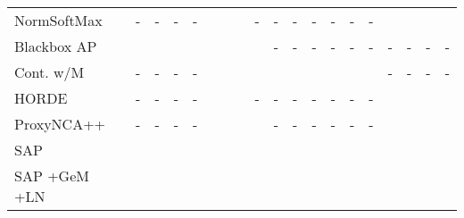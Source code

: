 \begin{table*}[t]
\begin{center}
\begin{tabular}{@{\zsp}l@{\xssp}l@{\xssp}|cccc|cccc|cc|cc|cc|cccc}
	\\
	
	NormSoftMax \cite{zw18} & {\scriptsize} &
	- &
	- &
	- &
	- &
	
	 &
	 &
	 &
	- &

	- &
	- &
	- &
	- &
	- &
	- &
	
	 &
	 &
	 &
	
	\\
	
	Blackbox AP \cite{rmp+20} & {\scriptsize} &
	 &
	 &
	 &
	 &
	
	 &
	 &
	 &
	 &
	
	- &
	- &
	- &
	- &
	- &
	- &

    - &
    - &
    - &
    -
	\\
	
	Cont. w/M \cite{wzh+20} & {\scriptsize} &
	- &
	- &
	- &
	- &
	
	 &
	 &
	 &
	 &

     &
     &
     &
     &
     &
     &

    - &
    - &
    - &
    -
	\\
	
	HORDE \cite{jph+19} & {\scriptsize} &
	- &
	- &
	- &
	- &
	
	 &
	 &
	 &
	- &

	- &
	- &
	- &
	- &
	- &
	- &
	
	 &
	 &
	 &
	
	\\
	
	ProxyNCA++ \cite{tdt20} & {\scriptsize} &
	- &
	- &
	- &
	- &
	
	 &
	 &
	 &
	 &

	- &
	- &
	- &
	- &
	- &
	- &
	
	 &
	 &
	 &
	
	\\
	
	
	SAP \cite{bxk+20} & {\scriptsize} &
	 &
	 &
	 &
	 &
	
	 &
	 &
	 & 
	 &

     &
     &
     &
     &
     &
     &
    
     &
     &
     &
    
	\\
	
	SAP\textsuperscript{\dag} \cite{bxk+20} {\tiny +GeM +LN} & {\scriptsize} &
	 &
	 &
	 &
	 &
	
	 &
	 &
	 &
	 &

     &
     &
     &
     &
     &
     &
    
     &
     &
     &
    

\end{tabular}
\end{center}
\end{table*}
